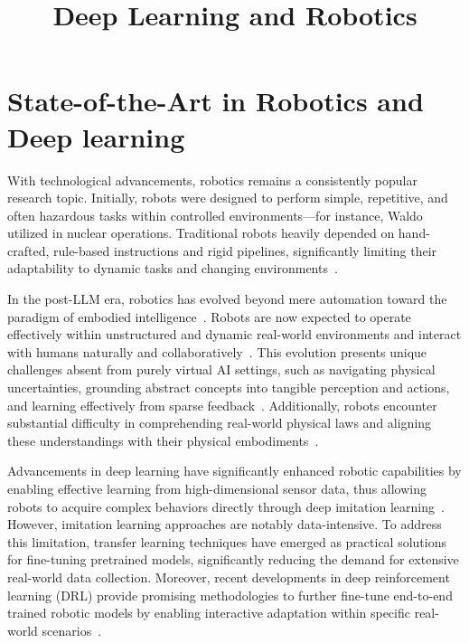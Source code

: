 \documentclass[conference]{IEEEtran}
\begin{document}
\title{Deep Learning and Robotics\\
}

\author{}

\maketitle


\section{\textbf{State-of-the-Art in Robotics and Deep learning}}
With technological advancements, robotics remains a consistently popular research topic. Initially, robots were designed to perform simple, repetitive, and often hazardous tasks within controlled environments—for instance, Waldo~\cite{technovelgy_waldo} utilized in nuclear operations. Traditional robots heavily depended on hand-crafted, rule-based instructions and rigid pipelines, significantly limiting their adaptability to dynamic tasks and changing environments~\cite{brooks1991new}.

In the post-LLM era, robotics has evolved beyond mere automation toward the paradigm of embodied intelligence~\cite{roy2021machine}. Robots are now expected to operate effectively within unstructured and dynamic real-world environments and interact with humans naturally and collaboratively~\cite{licardo2024intelligent}. This evolution presents unique challenges absent from purely virtual AI settings, such as navigating physical uncertainties, grounding abstract concepts into tangible perception and actions, and learning effectively from sparse feedback~\cite{wang2024large}. Additionally, robots encounter substantial difficulty in comprehending real-world physical laws and aligning these understandings with their physical embodiments~\cite{liu2024aligning}.

Advancements in deep learning have significantly enhanced robotic capabilities by enabling effective learning from high-dimensional sensor data, thus allowing robots to acquire complex behaviors directly through deep imitation learning~\cite{levine2016end}. However, imitation learning approaches are notably data-intensive. To address this limitation, transfer learning techniques have emerged as practical solutions for fine-tuning pretrained models, significantly reducing the demand for extensive real-world data collection. Moreover, recent developments in deep reinforcement learning (DRL) provide promising methodologies to further fine-tune end-to-end trained robotic models by enabling interactive adaptation within specific real-world scenarios~\cite{tang2024deep}.
\end{document}
